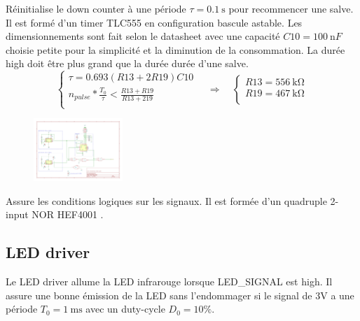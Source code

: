 \documentclass[french]{layout/Report}
\begin{document}
\begin{description}[leftmargin=!,labelwidth=3cm, labelindent=\parindent]
	\item[Burst timer] Réinitialise le down counter à une période $\tau = \SI{0.1}{\second}$ pour recommencer une salve. Il est formé d'un timer TLC555 en configuration bascule astable. Les dimensionnements sont fait selon le datasheet \cite{TLC555} avec une capacité $\mathit{C10} = \SI{100}{\nano F}$ choisie petite pour la simplicité et la diminution de la consommation. La durée high doit être plus grand que la durée durée d'une salve.
		\begin{equation*}
			\begin{cases}
				\tau = 0.693(\mathit{R13}+2\mathit{R19})\mathit{C10} \\
				n_{pulse}*\frac{T_0}{\tau} < \frac{\mathit{R13}+\mathit{R19}}{\mathit{R13}+2\mathit{19}} \\
			\end{cases}
		\quad\Rightarrow\quad
			\begin{cases}
				\mathit{R13} = \SI{556}{\kilo\ohm} \\
				\mathit{R19} = \SI{467}{\kilo\ohm} \\
			\end{cases}
		\end{equation*}

        \begin{figure}[H]
        \centering
        \includegraphics[width=0.3\textwidth]{fig/burst_timer.pdf}
        \end{figure}

	\item[Logic] Assure les conditions logiques sur les signaux. Il est formée d'un quadruple 2-input NOR HEF4001 \cite{HEF4001B}.
\end{description}

\subsection{LED driver}
\label{subsec:LED_driver}
Le LED driver allume la LED infrarouge lorsque LED\_SIGNAL est high. Il assure une bonne émission de la LED sans l'endommager si le signal de 3V a une période $T_0 = \SI{1}{\milli\second}$ avec un duty-cycle $D_0 = 10\%$.
\end{document}
